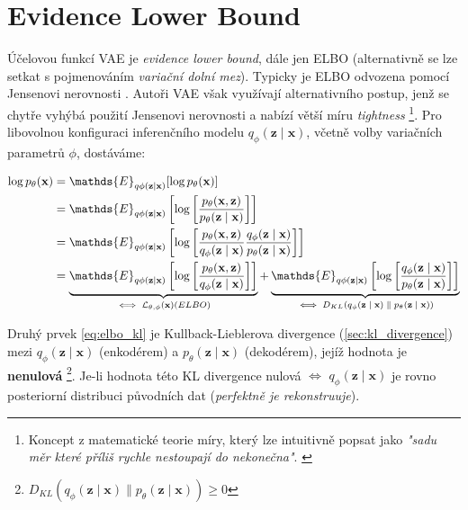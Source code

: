 \section{Evidence Lower Bound}
Účelovou funkcí VAE je \emph{evidence lower bound}, dále jen ELBO (alternativně se lze setkat s pojmenováním \emph{variační dolní mez}).
Typicky je ELBO odvozena pomocí Jensenovi nerovnosti \cite[Sekce 4.2]{Wasserman2013}.
Autoři VAE \cite{Kingma2014} však využívají alternativního postup, jenž se chytře vyhýbá použití Jensenovi nerovnosti a nabízí větší míru \emph{tightness}
\footnote{Koncept z matematické teorie míry, který lze intuitivně popsat jako \emph{"sadu měr které příliš rychle nestoupají do nekonečna"}. \cite{Topsoee1974}}. 
Pro libovolnou konfiguraci inferenčního modelu $q_\phi(\textbf{z}\mid\textbf{x})$, včetně volby variačních parametrů $\phi$, dostáváme:

\begin{align}
    \log p_\theta(\textbf{x}) &= \mathds{E}_{q\phi(\textbf{z}\mid\textbf{x})}[\log p_\theta(\textbf{x})] \\
                              &= \mathds{E}_{q\phi(\textbf{z}\mid\textbf{x})} \left[ \log \left[ \frac{p_\theta(\textbf{x}, \textbf{z})}{p_\theta(\textbf{z}\mid\textbf{x})} \right] \right] \\
                              &= \mathds{E}_{q\phi(\textbf{z}\mid\textbf{x})} \left[ \log \left[ \frac{p_\theta(\textbf{x}, \textbf{z})}{q_\phi(\textbf{z}\mid\textbf{x})} \frac{q_\phi(\textbf{z}\mid\textbf{x})}{p_\theta(\textbf{z}\mid\textbf{x})} \right] \right] \\
                              &= \underbrace{ \mathds{E}_{q\phi(\textbf{z}\mid\textbf{x})} \left[ \log \left[ \frac{p_\theta(\textbf{x}, \textbf{z})}{q_\phi(\textbf{z}\mid\textbf{x})} \right] \right] }_\text{$ \iff \mathcal{L}_{\theta,\phi}(\textbf{x}) (ELBO)$} 
                              +  \underbrace{ \mathds{E}_{q\phi(\textbf{z}\mid\textbf{x})} \left[ \log \left[ \frac{q_\phi(\textbf{z}\mid\textbf{x})}{p_\theta(\textbf{z}\mid\textbf{x})} \right] \right] }_\text{$\iff D_{KL}(q_\phi(\textbf{z}\mid\textbf{x})\parallel p_\theta(\textbf{z}\mid\textbf{x}))$} \\ \label{eq:elbo_kl}
\end{align}

Druhý prvek \autoref{eq:elbo_kl} je Kullback-Lieblerova divergence (\autoref{sec:kl_divergence}) mezi $q_\phi(\textbf{z}\mid\textbf{x})$ (enkodérem) a $p_\theta(\textbf{z}\mid\textbf{x})$ (dekodérem), jejíž hodnota je \textbf{nenulová}
\footnote{$D_{KL}(q_\phi(\textbf{z}\mid\textbf{x})\parallel p_\theta(\textbf{z}\mid\textbf{x})) \geq 0$}.
Je-li hodnota této KL divergence nulová $\iff$ $q_\phi(\textbf{z}\mid\textbf{x})$ je rovno posteriorní distribuci původních dat (\emph{perfektně je rekonstruuje}).


